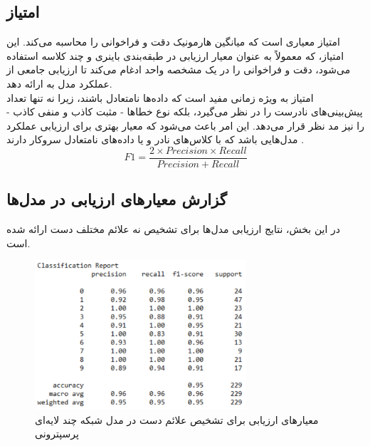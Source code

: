 \subsection{امتیاز }
امتیاز  معیاری است که میانگین هارمونیک دقت و فراخوانی را محاسبه می‌کند. این امتیاز، که معمولاً به عنوان معیار ارزیابی در طبقه‌بندی باینری و چند کلاسه استفاده می‌شود، دقت و فراخوانی را در یک مشخصه
واحد ادغام می‌کند تا ارزیابی جامعی از عملکرد مدل به ارائه دهد.
\\
امتیاز  به ویژه زمانی مفید است که داده‌ها نامتعادل باشند، زیرا نه تنها تعداد پیش‌بینی‌های نادرست را در نظر می‌گیرد، بلکه نوع خطاها - مثبت کاذب و منفی کاذب - را نیز مد نظر قرار می‌دهد. این امر باعث می‌شود که  معیار بهتری برای ارزیابی عملکرد مدل‌هایی باشد که با کلاس‌های نادر و یا داده‌های نامتعادل سروکار دارند \cite{F1scorei14:online}.
\begin{equation}
    F1  = \frac{2 \times Precision \times Recall}{Precision + Recall} 
\end{equation}




\subsection{گزارش معیارهای ارزیابی در مدل‌ها}
در این بخش، نتایج ارزیابی مدل‌ها برای تشخیص نه علائم مختلف دست ارائه شده است.

\begin{figure}[h]
    \centering
    \includegraphics[width=0.7\textwidth]{textchart.png}
    \caption{ معیارهای ارزیابی برای تشخیص علائم دست در مدل شبکه چند لایه‌ای پرسپترونی}
\end{figure}

